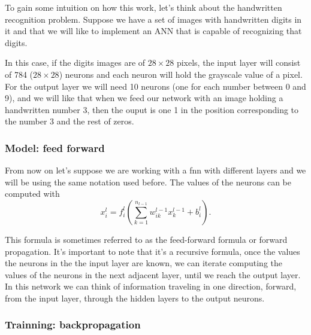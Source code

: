 \begin{exampleBox}
  To gain some intuition on how this work, let's think about the handwritten
  recognition problem. Suppose we have a set of images with handwritten digits
  in it and that we will like to implement an ANN that is capable of
  recognizing that digits.

  In this case, if the digits images are of \(28 \times 28\) pixels, the input
  layer will consist of 784 (\(28 \times 28\)) neurons and each neuron will
  hold the grayscale value of a pixel. For the output layer we will need 10
  neurons (one for each number between 0 and 9), and we will like that when we
  feed our network with an image holding a handwritten number 3, then the ouput
  is one 1 in the position corresponding to the number 3 and the rest of zeros.
\end{exampleBox}

\subsubsection{Model: feed forward}\label{subsec:forward}

From now on let's suppose we are working with a \gls{fnn} with different layers
and we will be using the same notation used before. The values of the neurons
can be computed with
\begin{equation}
  x_i^l = f_i^l \left(
    \sum_{k=1}^{n_{l-1}} w_{ik}^{l-1} x_{k}^{l-1} + b_i^l
  \right).
\end{equation}

This formula is sometimes referred to as the feed-forward formula or forward
propagation. It's important to note that it's a recursive formula, once the
values the neurons in the the input layer are known, we can iterate computing
the values of the neurons in the next adjacent layer, until we reach the output
layer. In this network we can think of information traveling in one direction,
forward, from the input layer, through the hidden layers to the output neurons.

\subsubsection{Trainning: backpropagation}%
\label{sec:backward}

